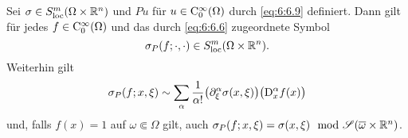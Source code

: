 \begin{lem}
Sei $\sigma\in S^m_{\rm loc}(\Omega\times\mathbb R^n)$ und $Pu$ für $u\in\mathrm C_0^\infty(\Omega)$ durch \eqref{eq:6:6.9} definiert. Dann gilt für jedes $f\in\mathrm C_0^\infty(\Omega)$
und das durch \eqref{eq:6:6.6} zugeordnete Symbol
\begin{equation}
    \sigma_P(f;\cdot,\cdot)\in S^m_{\rm loc}(\Omega\times\mathbb R^n). 
\end{equation}
Weiterhin gilt
\begin{equation}
   \sigma_P(f;x,\xi) \sim \sum_{\alpha}  \frac{1}{\alpha!} \big( \partial_\xi^\alpha \sigma(x,\xi) \big) \big(\mathrm D_x^\alpha f(x)\big)
\end{equation}
und, falls $f(x)=1$ auf $\omega\Subset\Omega$ gilt, auch $\sigma_P(f;x,\xi)=\sigma(x,\xi) \mod\mathscr S(\overline{\omega}\times\mathbb R^n)$.
\end{lem}
